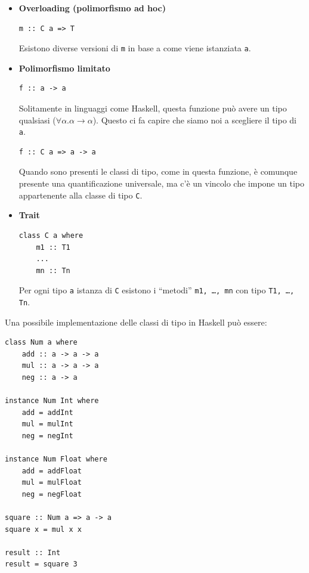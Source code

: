 \documentclass{article}
\begin{document}
\begin{itemize}
    \item \textbf{Overloading (polimorfismo ad hoc)}
    
\begin{tcolorbox}
\begin{verbatim}
m :: C a => T
\end{verbatim}
\end{tcolorbox}

    Esistono diverse versioni di \texttt{m} in base a come viene istanziata \texttt{a}.
    \item \textbf{Polimorfismo limitato}
    
\begin{tcolorbox}
\begin{verbatim}
f :: a -> a
\end{verbatim}
\end{tcolorbox}

    Solitamente in linguaggi come Haskell, questa funzione può avere un tipo qualsiasi ($\forall \alpha .\alpha \rightarrow  \alpha$). Questo ci fa capire che siamo noi a scegliere il tipo di \texttt{a}.

    \vspace{8pt}
\begin{tcolorbox}
\begin{verbatim}
f :: C a => a -> a
\end{verbatim}
\end{tcolorbox}

    Quando sono presenti le classi di tipo, come in questa funzione, è comunque presente una quantificazione universale, ma c'è un vincolo che impone un tipo appartenente alla classe di tipo \texttt{C}.
    \item \textbf{Trait}
    
\begin{tcolorbox}
\begin{verbatim}
class C a where
    m1 :: T1
    ...
    mn :: Tn
\end{verbatim}
\end{tcolorbox}

    Per ogni tipo \texttt{a} istanza di \texttt{C} esistono i “metodi” \texttt{m1, \dots, mn} con tipo \texttt{T1, \dots, Tn}.
\end{itemize}

\pagebreak

Una possibile implementazione delle classi di tipo in Haskell può essere:
\begin{tcolorbox}
\begin{verbatim}
class Num a where
    add :: a -> a -> a
    mul :: a -> a -> a
    neg :: a -> a

instance Num Int where
    add = addInt
    mul = mulInt
    neg = negInt

instance Num Float where
    add = addFloat
    mul = mulFloat
    neg = negFloat

square :: Num a => a -> a
square x = mul x x

result :: Int
result = square 3
\end{verbatim}
\end{tcolorbox}
\end{document}
